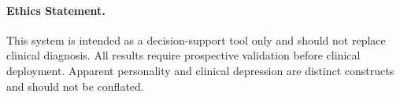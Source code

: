 \documentclass[twocolumn]{article}
\begin{document}
\paragraph{Ethics Statement.} This system is intended as a decision-support tool only and should not replace clinical diagnosis. All results require prospective validation before clinical deployment. Apparent personality and clinical depression are distinct constructs and should not be conflated.



\end{document}
